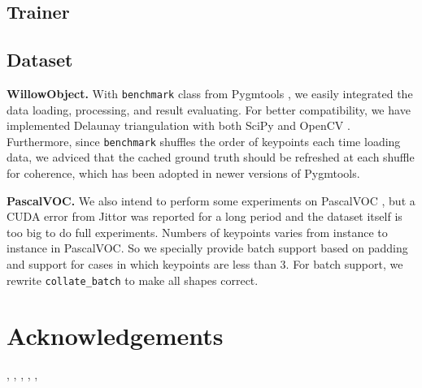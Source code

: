 \documentclass[a4paper]{article}
\begin{document}
\subsection{Trainer}

\subsection{Dataset}
\textbf{WillowObject.}
With \texttt{benchmark} class from Pygmtools \cite{pygmtools}, we easily integrated the data loading, processing, and result evaluating. For better compatibility, we have implemented Delaunay triangulation with both SciPy \cite{scipy} and OpenCV \cite{opencv}. Furthermore, since \texttt{benchmark} shuffles the order of keypoints each time loading data, we adviced that the cached ground truth should be refreshed at each shuffle for coherence, which has been adopted in newer versions of Pygmtools. 

\textbf{PascalVOC.}
We also intend to perform some experiments on PascalVOC \cite{voc1,voc2}, but a CUDA error from Jittor \cite{jittor} was reported for a long period and the dataset itself is too big to do full experiments. Numbers of keypoints varies from instance to instance in PascalVOC. So we specially provide batch support based on padding and support for cases in which keypoints are less than $3$. For batch support, we rewrite \texttt{collate_batch} to make all shapes correct.

\section{Acknowledgements}

\cite{pca-ipca}, \cite{cie}, \cite{voc1}, \cite{voc2}, \cite{willow}, \cite{vgg}

\newpage 


\end{document}

